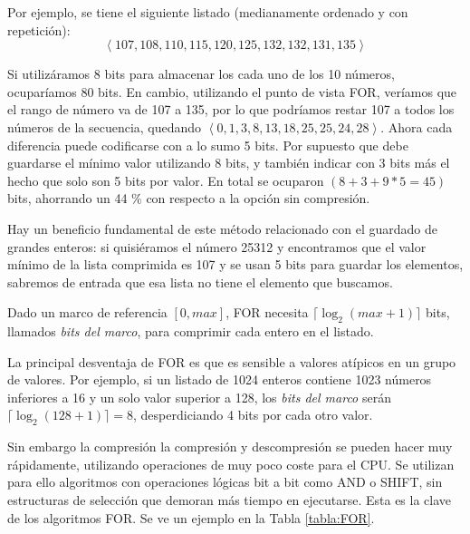 Por ejemplo, se tiene el siguiente listado (medianamente ordenado y con repetición): 
\[\left< 107,108,110,115,120,125,132,132,131,135 \right> \]

Si utilizáramos 8 bits para almacenar los cada uno de los 10 números, ocuparíamos 80 bits. En cambio, utilizando el punto de vista FOR, veríamos que el rango de número va de 107 a 135, por lo que podríamos restar 107 a todos los números de la secuencia, quedando $\left< 0, 1, 3, 8, 13, 18, 25, 25, 24, 28 \right>$. Ahora cada diferencia puede codificarse con a lo sumo 5 bits. Por supuesto que debe guardarse el mínimo valor utilizando 8 bits, y también indicar con 3 bits más el hecho que solo son 5 bits por valor. En total se ocuparon $(8+3+9*5=45)$ bits, ahorrando un 44 \% con respecto a la opción sin compresión.

Hay un beneficio fundamental de este método relacionado con el guardado de grandes enteros: si quisiéramos el número 25312 y encontramos que el valor mínimo de la lista comprimida es 107 y se usan 5 bits para guardar los elementos, sabremos de entrada que esa lista no tiene el elemento que buscamos.

Dado un marco de referencia $[0, max]$, FOR necesita $\lceil \log_2(max+1) \rceil$ bits, llamados \textit{bits del marco}, para comprimir cada entero en el listado. 

La principal desventaja de FOR es que es sensible a valores atípicos en un grupo de valores. Por ejemplo, si un listado de 1024 enteros contiene 1023 números inferiores a 16 y un solo valor superior a 128, los \textit{bits del marco} serán $\lceil \log_2(128+1) \rceil = 8$, desperdiciando 4 bits por cada otro valor.

Sin embargo la compresión la compresión y descompresión se pueden hacer muy rápidamente, utilizando operaciones de muy poco coste para el CPU. Se utilizan para ello algoritmos con operaciones lógicas bit a bit como AND o SHIFT, sin estructuras de selección que demoran más tiempo en ejecutarse. Esta es la clave de los algoritmos FOR. Se ve un ejemplo en la Tabla \ref{tabla:FOR}.







